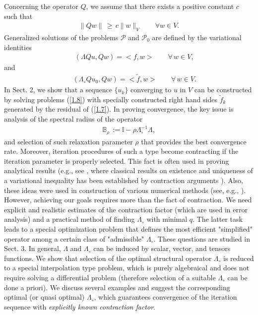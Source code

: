\documentclass[amstex,amstext,amsfonts,epsf,12pt] {amsart}
\newcommand\ben{\begin{eqnarray}}
\newcommand\een{\end{eqnarray}}
\def\ben{\begin{eqnarray}}
\def\een{\end{eqnarray}}
\def\wt{\widetilde}
\begin{document}
Concerning the operator $Q$, we assume that there exists a positive constant $c$ such that
\ben
\label{1.6}
\|Q w\|\,\geq\, c\|w\|_V\qquad\forall w\in V.
\een
Generalized solutions of the problems ${\mathcal P}$ and ${\mathcal P}_0$ are defined
by the variational identities
\ben
\label{1.7}
&&(\Lambda Q u,Qw)=<f,w>\qquad\forall \,w\in V,
\een
and
\ben
\label{1.8}
&&(\Lambda_\circ Q u_0,Qw)=<\wt f,w>\qquad\forall \,w\in V.
\een
In Sect. 2, we show that a sequence $\{u_k\}$ converging to $u$ in $V$
can be constructed by solving  problems (\ref{1.8}) with specially
constructed right hand sides $\wt f_k$ generated by the residual of (\ref{1.7}). 
In proving convergence, the key
issue is analysis of the spectral radius of the operator
  \ben
 \label{1.9}
{\mathbb B}_\rho\,:={\mathbb I}-\rho \Lambda^{-1}_\circ \Lambda,
\een
and selection of such relaxation parameter $\rho$ that provides the best convergence rate.
Moreover, iteration procedures of such a type become contracting
if the iteration parameter is properly selected. This fact
is often used in proving analytical results (e.g., see \cite{LiSt1967}, 
where classical results on existence
and uniqueness of a variational inequality has been established
by  contraction arguments ). Also, these ideas were used
in construction of various numerical methods
(see, e.g., \cite{GlLiTr}). However, achieving our goals requires more than the fact of 
contraction. We need explicit
and realistic estimates of the contraction factor (which are used in
error analysis) and a practical method of finding $\Lambda_\circ$ with minimal
$q$. The latter task leads to a special optimization problem that
defines the most efficient "simplified" operator among  a certain class
of "admissible" $\Lambda_\circ$. These questions are studied
in Sect. 3.
In general, $\Lambda$ and $\Lambda_\circ$ can be  induced by scalar,
vector, and tensors functions. We show that selection of the optimal 
structural operator $\Lambda_\circ$  is reduced to a special interpolation type problem, 
which is purely algebraical and 
does not require solving a differential problem (therefore selection of a suitable
$\Lambda_\circ$ can be done a priori). We discuss several examples
and suggest the corresponding optimal (or quasi optimal) $\Lambda_\circ$,
which guarantees convergence of the iteration sequence with {\em explicitly
known contraction factor}. 
\end{document}
